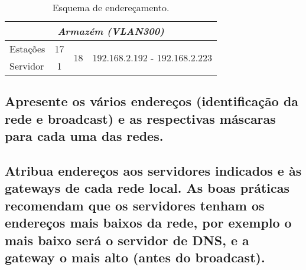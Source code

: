 \documentclass[a4paper,12pt]{article}
\begin{document}
\begin{table}[h]
\begin{tabular}{ l | c | c | c }
      \multicolumn{4}{c}{\textit{Armazém (VLAN300)}} \\\hline
      Estações & 17 & \multirow{2}{*}{18} & \multirow{2}{*}{192.168.2.192 - 192.168.2.223} \\\cline{1-2}
      Servidor & 1 & \\ \bottomrule

   \end{tabular}
   \caption{Esquema de endereçamento.}
   \label{tab:enderecamento_esquema}
\end{table}

\subsection{Apresente os vários endereços (identificação da rede e broadcast) e as
respectivas máscaras para cada uma das redes.}
\subsection{Atribua endereços aos servidores indicados e às gateways de cada rede local.
As boas práticas recomendam que os servidores tenham os endereços mais
baixos da rede, por exemplo o mais baixo será o servidor de DNS, e a gateway
o mais alto (antes do broadcast).}
\end{document}
